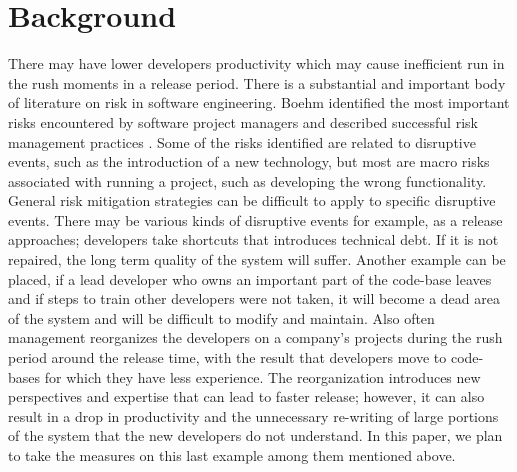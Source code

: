 \documentclass{acm_proc_article-sp}
\begin{document}
\section{Background}
There may have lower developers productivity \cite{cataldo_identification, damian_awareness} which may cause inefficient run in the rush moments in a release period. There is a substantial and important body of literature on risk in software engineering. Boehm identified the most important risks encountered by software project managers and described successful risk management practices \cite{boehm_software_risk, keil_framework, boehm_agile}. Some of the risks identified are related to disruptive events, such as the introduction of a new technology, but most are macro risks associated with running a project, such as developing the wrong functionality. General risk mitigation strategies can be difficult to apply to specific disruptive events. There may be various kinds of disruptive events for example, as a release approaches; developers take shortcuts that introduces technical debt. If it is not repaired, the long term quality of the system will suffer. Another example can be placed, if a lead developer who owns an important part of the code-base leaves and if steps to train other developers were not taken, it will become a dead area of the system and will be difficult to modify and maintain. Also often management reorganizes the developers on a company's projects during the rush period around the release time, with the result that developers move to code-bases for which they have less experience. The reorganization introduces new perspectives and expertise that can lead to faster release; however, it can also result in a drop in productivity and the unnecessary re-writing of large portions of the system that the new developers do not understand.
In this paper, we plan to take the measures on this last example among them mentioned above.
\end{document}
